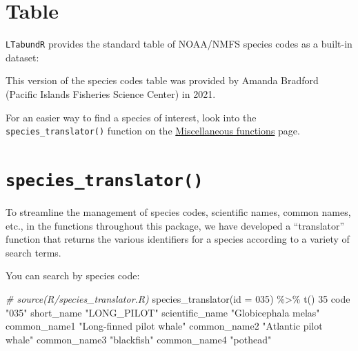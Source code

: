 \documentclass[
]{book}
\newenvironment{Shaded}{\begin{snugshade}}{\end{snugshade}}
\newcommand{\AttributeTok}[1]{\textcolor[rgb]{0.77,0.63,0.00}{#1}}
\newcommand{\CommentTok}[1]{\textcolor[rgb]{0.56,0.35,0.01}{\textit{#1}}}
\newcommand{\DecValTok}[1]{\textcolor[rgb]{0.00,0.00,0.81}{#1}}
\newcommand{\FunctionTok}[1]{\textcolor[rgb]{0.00,0.00,0.00}{#1}}
\newcommand{\NormalTok}[1]{#1}
\newcommand{\SpecialCharTok}[1]{\textcolor[rgb]{0.00,0.00,0.00}{#1}}
\newcommand{\StringTok}[1]{\textcolor[rgb]{0.31,0.60,0.02}{#1}}
\begin{document}
\hypertarget{table}{%
\section*{Table}\label{table}}

\texttt{LTabundR} provides the standard table of NOAA/NMFS species codes as a built-in dataset:

This version of the species codes table was provided by Amanda Bradford (Pacific Islands Fisheries Science Center) in 2021.

For an easier way to find a species of interest, look into the \texttt{species\_translator()} function on the \protect\hyperlink{misc_functions}{Miscellaneous functions} page.

\hypertarget{species_translator}{%
\section*{\texorpdfstring{\texttt{species\_translator()}}{species\_translator()}}\label{species_translator}}

To streamline the management of species codes, scientific names, common names, etc., in the functions throughout this package, we have developed a ``translator'' function that returns the various identifiers for a species according to a variety of search terms.

You can search by species code:

\begin{Shaded}
\begin{Highlighting}[]
\CommentTok{\# source(\textquotesingle{}R/species\_translator.R\textasciigrave{})}
\FunctionTok{species\_translator}\NormalTok{(}\AttributeTok{id =} \StringTok{\textquotesingle{}035\textquotesingle{}}\NormalTok{) }\SpecialCharTok{\%\textgreater{}\%} \FunctionTok{t}\NormalTok{()}
                \DecValTok{35}                       
\NormalTok{code            }\StringTok{"035"}                    
\NormalTok{short\_name      }\StringTok{"LONG\_PILOT"}             
\NormalTok{scientific\_name }\StringTok{"Globicephala melas"}     
\NormalTok{common\_name1    }\StringTok{"Long{-}finned pilot whale"}
\NormalTok{common\_name2    }\StringTok{"Atlantic pilot whale"}   
\NormalTok{common\_name3    }\StringTok{"blackfish"}              
\NormalTok{common\_name4    }\StringTok{"pothead"}                
\end{Highlighting}
\end{Shaded}
\end{document}
